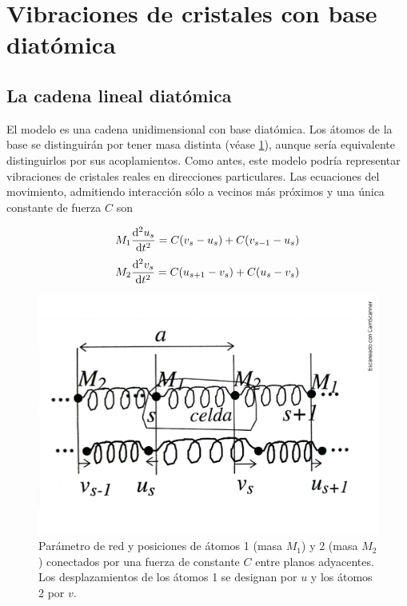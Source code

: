 \section{Vibraciones de cristales con base diatómica}

\subsection{La cadena lineal diatómica}

El modelo es una cadena unidimensional con base diatómica. Los átomos de la base se distinguirán por tener masa distinta (véase \ref{Fig:04-04}), aunque sería equivalente distinguirlos por sus acoplamientos. Como antes, este modelo podría representar vibraciones de cristales reales en direcciones particulares. Las ecuaciones del movimiento, admitiendo interacción sólo a vecinos más próximos y una única constante de fuerza $C$ son 

\begin{equation*}
	M_1 \frac{\mathrm{d} ^2 u_s}{\mathrm{d} t^2} = C(v_s - u_s) + C(v_{s-1}-u_s)
\end{equation*}
\begin{equation}
	M_2 \frac{\mathrm{d} ^2 v_s}{\mathrm{d} t^2} = C(u_{s+1} - v_s) + C(u_{s}-v_s) \label{Ec:04-02-01}
\end{equation}

\begin{figure}[h!] \centering
    \includegraphics[scale=0.4]{Cuerpo/Ch_04/Fotos libro 4.pdf}
    \caption{Parámetro de red y posiciones de átomos 1 (masa $M_1$) y 2 (masa $M_2$) conectados por una fuerza de constante $C$ entre planos adyacentes. Los desplazamientos de los átomos 1 se designan por $u$ y los átomos 2 por $v$.}
    \label{Fig:04-04}
\end{figure}    

